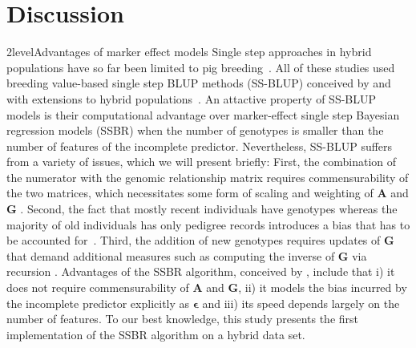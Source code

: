 \documentclass[12pt,titlepage]{article}
\begin{document}
\section*{Discussion}
\Genetics2level{Advantages of marker effect models}
Single step approaches in hybrid populations have so far been limited to pig
breeding~\cite{Xiang2015,Xiang2016,Tusell2016}.
All of these studies used breeding value-based single step BLUP methods
(SS-BLUP) conceived by  and  with
extensions to hybrid populations~\cite{Christensen2014,Christensen2015}.
An attactive property of SS-BLUP models is their computational advantage over 
marker-effect single step Bayesian regression models (SSBR) when the number of 
genotypes is smaller than the number of features of the incomplete predictor.
Nevertheless, SS-BLUP suffers from a variety of issues, which we will present
briefly:
First, the combination of the numerator with the genomic relationship matrix
requires commensurability of the two matrices, which necessitates some form of
scaling and weighting of $\mathbf{A}$ and $\mathbf{G}$
\cite{Christensen2012,Christensen2012a}.
Second, the fact that mostly recent individuals have genotypes whereas the 
majority of old individuals has only pedigree records introduces a bias that 
has to be accounted for~\cite{Vitezica2011,Legarra2015,Garcia-Baccino2017}.
Third, the addition of new genotypes requires updates of $\mathbf{G}$ that
demand additional measures such as computing the inverse of $\mathbf{G}$ via
recursion
\cite{Misztal2014,Misztal2016,Misztal2016a,Fragomeni2015,Masuda2016,Pocrnic2016}.
Advantages of the SSBR algorithm, conceived by , include
that i) it does not require commensurability of $\mathbf{A}$ and $\mathbf{G}$, 
ii) it models the bias incurred by the incomplete predictor explicitly as 
$\mathbf{\epsilon}$ and iii) its speed depends largely on the number of 
features.
To our best knowledge, this study presents the first implementation of the SSBR 
algorithm on a hybrid data set.
\end{document}
